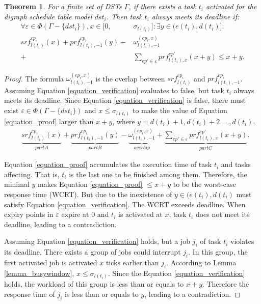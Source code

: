 \documentclass[10pt,conference]{IEEEtran}
\newtheorem{theorem}{Theorem}
\begin{document}
\begin{theorem}\label{theorem_testtask}
  For a finite set of DSTs $\Gamma$, if there exists a task $t_i$ activated for the digraph schedule table model $dst_i$. Then task $t_i$ always meets its deadline if:
   \begin{equation}\begin{split}
      \forall \varepsilon\in\Phi(\Gamma-\{dst_i\}),x\in[0,&\sigma_{l(t_i)}]:\exists y\in(e(t_i),d(t_i)]:
      \\
      srf^{ep_i}_{l(t_i)}(x)+prf^{ep_i}_{l(t_i),-1}(y)-&\omega_{l(t_i),-1}^{(ep_i,x)}
      \\
      +&\sum\limits_{ep'\in \varepsilon}prf^{ep'}_{l(t_i),x}(x+y)\leq x+y.
    \end{split}\label{equation_verification}\end{equation}
\end{theorem}
\begin{proof}

  The formula $\omega_{l(t_i),-1}^{(ep_i,x)}$ is the overlap between $srf^{ep_i}_{l(t_i)}$ and $prf^{ep_i}_{l(t_i),-1}$. Assuming Equation \ref{equation_verification} evaluates to false, but task $t_i$ always meets its deadline. Since Equation \ref{equation_verification} is false, there must exist $\varepsilon\in\Phi(\Gamma-\{dst_i\})$ and $x\leq \sigma_{l(t_i)}$ to make the value of Equation \ref{equation_proof} larger than $x+y$, where $y=d(t_i)+1,d(t_i)+2,\dots,d(t_i)$.
  \begin{equation}\begin{split}
      &\underbrace{srf^{ep_i}_{l(t_i)}(x)}_{part A}+\underbrace{prf^{ep_i}_{l(t_i),-1}(y)}_{part B}-\underbrace{\omega^{(ep_i,x)}_{l(t_i),-1}}_{overlap}+\underbrace{\sum\limits_{ep'\in \varepsilon}prf^{ep'}_{l(t_i),x}(x+y)}_{part C}.
    \end{split}\label{equation_proof}\end{equation}
  
   Equation \ref{equation_proof} accumulates the execution time of task $t_i$ and tasks affecting. That is, $t_i$ is the last one to be finished among them. Therefore, the minimal $y$ makes Equation \ref{equation_proof} $\leq x+y$ to be the worst-case response time (WCRT). But due to the inexistence of $y\in(e(t_i),d(t_i)$ must satisfy Equation \ref{equation_verification}. The WCRT exceeds deadline. When expiry points in $\varepsilon$ expire at 0 and $t_i$ is activated at $x$, task $t_i$ does not meet its deadline, leading to a contradiction. 
  
  Assuming Equation \ref{equation_verification} holds, but a job $j_i$ of task $t_i$ violates its deadline. There exists a group of jobs could interrupt $j_i$. In this group, the first activated job is activated $x$ ticks earlier than $j_i$. According to Lemma \ref{lemma_busywindow}, $x\leq \sigma_{l(t_i)}$. Since the Equation \ref{equation_verification} holds, the workload of this group is less than or equals to $x+y$. Therefore the response time of $j_i$ is less than or equals to $y$, leading to a contradiction.
\end{proof}
\end{document}
